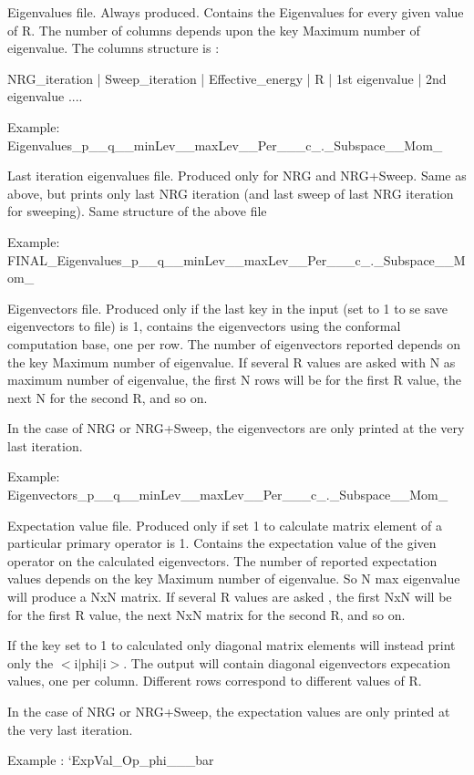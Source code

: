 \begin{DoxyItemize}
\item Eigenvalues file. Always produced. Contains the Eigenvalues for every given value of R. The number of columns depends upon the key {\ttfamily Maximum number of eigenvalue}. The columns structure is \+: \begin{DoxyVerb}NRG_iteration   |  Sweep_iteration | Effective_energy |   R   |  1st eigenvalue | 2nd eigenvalue ....
\end{DoxyVerb}


Example\+: {\ttfamily Eigenvalues\+\_\+p\+\_\+\_\+q\+\_\+\_\+min\+Lev\+\_\+\_\+max\+Lev\+\_\+\_\+\+Per\+\_\+\_\+\_\+c\+\_.\+\_\+\+Subspace\+\_\+\_\+\+Mom\+\_}
\item Last iteration eigenvalues file. Produced only for N\+RG and N\+R\+G+\+Sweep. Same as above, but prints only last N\+RG iteration (and last sweep of last N\+RG iteration for sweeping). Same structure of the above file

Example\+: {\ttfamily F\+I\+N\+A\+L\+\_\+\+Eigenvalues\+\_\+p\+\_\+\_\+q\+\_\+\_\+min\+Lev\+\_\+\_\+max\+Lev\+\_\+\_\+\+Per\+\_\+\_\+\_\+c\+\_.\+\_\+\+Subspace\+\_\+\_\+\+Mom\+\_}
\item Eigenvectors file. Produced only if the last key in the input ({\ttfamily set to 1 to se save eigenvectors to file}) is 1, contains the eigenvectors using the conformal computation base, one per row. The number of eigenvectors reported depends on the key {\ttfamily Maximum number of eigenvalue}. If several R values are asked with N as maximum number of eigenvalue, the first N rows will be for the first R value, the next N for the second R, and so on.

In the case of N\+RG or N\+R\+G+\+Sweep, the eigenvectors are only printed at the very last iteration.

Example\+: {\ttfamily Eigenvectors\+\_\+p\+\_\+\_\+q\+\_\+\_\+min\+Lev\+\_\+\_\+max\+Lev\+\_\+\_\+\+Per\+\_\+\_\+\_\+c\+\_.\+\_\+\+Subspace\+\_\+\_\+\+Mom\+\_}
\item Expectation value file. Produced only if {\ttfamily set 1 to calculate matrix element of a particular primary operator} is 1. Contains the expectation value of the given operator on the calculated eigenvectors. The number of reported expectation values depends on the key {\ttfamily Maximum number of eigenvalue}. So N max eigenvalue will produce a NxN matrix. If several R values are asked , the first NxN will be for the first R value, the next NxN matrix for the second R, and so on.

If the key {\ttfamily set to 1 to calculated only diagonal matrix elements} will instead print only the $<$i$\vert$phi$\vert$i$>$. The output will contain diagonal eigenvectors expecation values, one per column. Different rows correspond to different values of R.

In the case of N\+RG or N\+R\+G+\+Sweep, the expectation values are only printed at the very last iteration.

Example \+: `\+Exp\+Val\+\_\+\+Op\+\_\+phi\+\_\+\_\+\_\+bar 
\end{DoxyItemize}